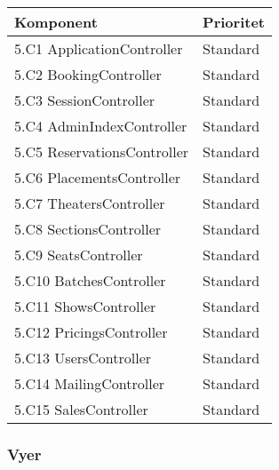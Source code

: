 \documentclass[a4paper, twoside, 11pt, titlepage]{article}
\begin{document}
		\begin {table} [ht] \begin{tabular} {  p{10cm} p{5.1cm} }
			\hline
			{\sffamily\textbf{Komponent}} & {\sffamily\textbf{Prioritet}} \\
			\hline
			{ 5.C1 ApplicationController } & { Standard } \\
			\hline
			{ 5.C2 BookingController } & { Standard } \\
			\hline
			{ 5.C3 SessionController } & { Standard } \\
			\hline
			{ 5.C4 AdminIndexController } & { Standard } \\
			\hline
			{ 5.C5 ReservationsController } & { Standard } \\
			\hline
			{ 5.C6 PlacementsController } & { Standard } \\
			\hline
			{ 5.C7 TheatersController } & { Standard } \\
			\hline
			{ 5.C8 SectionsController } & { Standard } \\
			\hline
			{ 5.C9 SeatsController } & { Standard } \\
			\hline
			{ 5.C10 BatchesController } & { Standard } \\
			\hline
			{ 5.C11 ShowsController } & { Standard } \\
			\hline
			{ 5.C12 PricingsController } & { Standard } \\
			\hline
			{ 5.C13 UsersController } & { Standard } \\
			\hline
			{ 5.C14 MailingController } & { Standard } \\
			\hline
			{ 5.C15 SalesController } & { Standard } \\
			\hline
		\end{tabular} \end{table} \FloatBarrier


		\clearpage %
		\subsubsection{Vyer}
\end{document}
